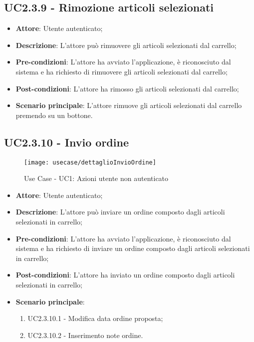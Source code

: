 \subsection{UC2.3.9 - Rimozione articoli selezionati}

\begin{itemize}
	\item \textbf{Attore}: Utente autenticato;
	\item \textbf{Descrizione}: L'attore può rimuovere gli articoli selezionati dal carrello;
	\item \textbf{Pre-condizioni}: L'attore ha avviato l'applicazione, è riconosciuto dal sistema e ha richiesto di rimuovere gli articoli selezionati dal carrello;
	\item \textbf{Post-condizioni}: L'attore ha rimosso gli articoli selezionati dal carrello;
	\item \textbf{Scenario principale}: L'attore rimuove gli articoli selezionati dal carrello premendo su un bottone.
\end{itemize}

\subsection{UC2.3.10 - Invio ordine}

\begin{figure}[!h] 
    \centering 
    \texttt{[image: usecase/dettaglioInvioOrdine]} 
    \caption{Use Case - UC1: Azioni utente non autenticato}
\end{figure}

\begin{itemize}
	\item \textbf{Attore}: Utente autenticato;
	\item \textbf{Descrizione}: L'attore può inviare un ordine composto dagli articoli selezionati in carrello;
	\item \textbf{Pre-condizioni}: L'attore ha avviato l'applicazione, è riconosciuto dal sistema e ha richiesto di inviare un ordine composto dagli articoli selezionati in carrello;
	\item \textbf{Post-condizioni}: L'attore ha inviato un ordine composto dagli articoli selezionati in carrello;
	\item \textbf{Scenario principale}:
		\begin{enumerate}
			\item UC2.3.10.1 - Modifica data ordine proposta;
			\item UC2.3.10.2 - Inserimento note ordine.
		\end{enumerate}
\end{itemize}

